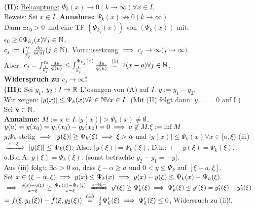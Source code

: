 \documentclass{article}
\begin{document}
\begin{beweis}
\textbf{(II):} \underline{Behauptung:} $\Psi_k(x)\to 0 (k\to \infty) \forall x \in I$.\\
\underline{Beweis:} Sei $x\in I$. \textbf{ Annahme: } $\Psi_k(x) \not\to 0 (k \to \infty)$. \\
Dann $\exists \epsilon_0 > 0$ und eine TF $(\Psi_{k_j}(x))$ von $(\Psi_k(x))$ mit:\\
$\epsilon_0 \ge 0 \Psi_{k_j}(x)\forall j \in \mathbb{N}$.\\
$c_j:=\int_{\frac{1}{k_j}}^{\epsilon_0}\frac{du}{\phi(u)} (j \in \mathbb{N})$. Vorraussetzung $\implies c_j \to \infty (j\to\infty)$.\\
Aber: $c_j=\int^{\ep_0}_{\frac{1}{k_j}}\frac{du}{\phi(u)} \le \int_{\frac{1}{k_j}}^{\Psi_{k_j}(x)}\frac{du}{\phi(u)} \gleichwegen{(1)} 2(x-a)\forall j\in\MdN$.\\
\textbf{Widerspruch zu $c_j \to \infty$!}\\

\textbf{(III):} Sei $y_1$, $y_2:I\to \mathbb{R}$ L"osungen von (A) auf $I$. $y:=y_1-y_2$. \\
Wir zeigen: $|y(x)|\le \Psi_k(x) \forall k \in \mathbb{N} \forall x \in I$. (Mit (II) folgt dann: $y == 0$ auf I.)\\
Sei $k \in \mathbb{N}$.\\
\textbf{Annahme:} $M:={x \in I:|y(x)| > \Psi_k(x)}\ne \emptyset$.\\
$y(a) = y(x_0)=y_1(x_0)-y_2(x_0)=0 \implies a \not \in M. \xi := \inf M$\\
$y$,$\Psi_k$ stetig $\implies |y(\xi)|\ge\Psi_k(\xi) \implies \xi > a$ und $|y(x)| \le \Psi_k(x) \forall x \in [a,\xi)$ (iii)\\
$\folgtwegen{x\to\xi-} |y(\xi)|\le \Psi_k(\xi).$ Also: $|y(\xi)|=\Psi_k(\xi).$ D.h.: $+- y(\xi) = \Psi_k(\xi).$ o.B.d.A: $y(\xi)=\Psi_k(\xi)$. (sonst betrachte $y_2-y_1=-y$).\\
Aus (iii) folgt: $\exists \alpha > 0$ so, dass $\xi-\alpha \ge a$ und $0 < y \le \Psi_k$ auf $[\xi-a,\xi]$.\\
Sei $x\in(\xi-\alpha,\xi) \implies y(x)\le \Psi_k(x) \implies y(x)-y(\xi)\le \Psi_k(x)-\Psi_k(\xi)$\\
$\folgt \frac{y(x)-y(\xi)}{x-\xi}\ge \frac{\Psi_k(x)-\Psi_k(\xi)}{x-\xi} \folgtwegen{x\to\xi-} y'(\xi)\ge\Psi'_k(\xi) \folgt \Psi'_k(\xi)\le y'(\xi)=y'_1(\xi)-y'_2(\xi)$\\
$=f(\xi,y_1(\xi))-f(\xi,y_2(\xi)) \gleichwegen{(ii)} \frac{1}{2}\Psi'_k(\xi) \folgt \Psi'_k(\xi)\le 0$, Widersruch zu (ii)!.

\end{beweis}
\end{document}
